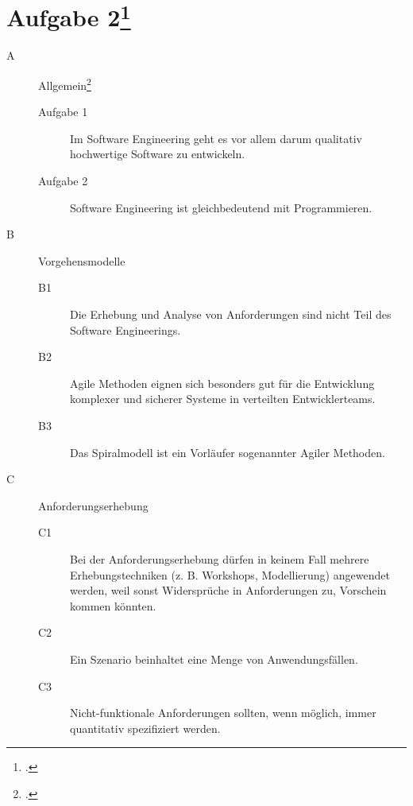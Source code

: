 \documentclass{lehramt-informatik-minimal}
\begin{document}
\section{Aufgabe 2\footcite{sosy:ab:9}}

\begin{description}

%

\item[A] Allgemein\footcite[Herbst 2016 (66116) - Thema 2 Teilaufgabe 2, Aufgabe 1a]{examen:66116:2016:09}

\begin{description}
\item[Aufgabe 1] Im Software Engineering geht es vor allem darum qualitativ
hochwertige Software zu entwickeln.

\item[Aufgabe 2] Software Engineering ist gleichbedeutend mit Programmieren.
\end{description}

%

\item[B] Vorgehensmodelle

\begin{description}
\item[B1] Die Erhebung und Analyse von Anforderungen sind nicht Teil des
Software Engineerings.

\item[B2] Agile Methoden eignen sich besonders gut für die Entwicklung
komplexer und sicherer Systeme in verteilten Entwicklerteams.

\item[B3] Das Spiralmodell ist ein Vorläufer sogenannter Agiler
Methoden.
\end{description}

%

\item[C] Anforderungserhebung

\begin{description}
\item[C1] Bei der Anforderungserhebung dürfen in keinem Fall mehrere
Erhebungstechniken (z. B. Workshops, Modellierung) angewendet werden,
weil sonst Widersprüche in Anforderungen zu, Vorschein kommen könnten.

\item[C2] Ein Szenario beinhaltet eine Menge von Anwendungsfällen.

\item[C3] Nicht-funktionale Anforderungen sollten, wenn möglich, immer
quantitativ spezifiziert werden.
\end{description}


\end{description}
\end{document}

